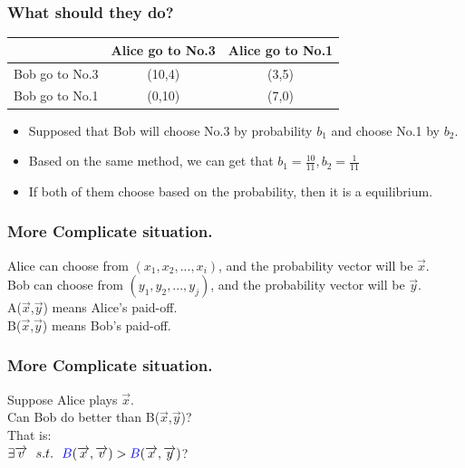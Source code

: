 \documentclass{beamer}
\begin{document}
\begin{frame}
\frametitle{What should they do?}
\begin{tabular}{|c|c|c|}
\hline
\hline
    & {\color{red}Alice} go to No.3 & {\color{red}Alice} go to No.1\\
\hline
{\color{blue}Bob} go to No.3 & ({\color{blue}10},{\color{red}4}) & ({\color{blue}3},{\color{red}5})\\
\hline
{\color{blue}Bob} go to No.1 & ({\color{blue}0},{\color{red}10}) & ({\color{blue}7},{\color{red}0})\\
\hline
\hline
\end{tabular}
\begin{itemize}
\item Supposed that Bob will choose No.3 by probability $b_1$ and choose No.1 by $b_2$.
\item Based on the same method, we can get that $b_1 = \frac{10}{11},b_2 = \frac{1}{11}$
\item If both of them choose based on the probability, then it is a equilibrium.
\end{itemize}
\end{frame}

\begin{frame}
\frametitle{More Complicate situation.}
{\color{red}Alice} can choose from $(x_1,x_2,...,x_i)$, and the probability vector will be $\overrightarrow{x}$.\\
{\color{blue}Bob} can choose from $(y_1,y_2,...,y_j)$, and the probability vector will be $\overrightarrow{y}$.\\
{\color{red}A}($\overrightarrow{x}$,$\overrightarrow{y}$) means {\color{red}Alice}'s paid-off.\\
{\color{blue}B}($\overrightarrow{x}$,$\overrightarrow{y}$) means {\color{blue}Bob}'s paid-off.\\
\end{frame}

\begin{frame}
\frametitle{More Complicate situation.}
Suppose {\color{red}Alice} plays $\overrightarrow{x}$.\\
Can {\color{blue}Bob} do better than {\color{blue}B}($\overrightarrow{x}$,$\overrightarrow{y}$)?\\
That is:\\
        \qquad $\exists \overrightarrow{v} ~~s.t. ~~{\color{blue}B}(\overrightarrow{x},\overrightarrow{v}) >{\color{blue}B}(\overrightarrow{x},\overrightarrow{y})$?
\end{frame}
\end{document}
